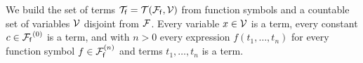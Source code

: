
\begin{definition}\label{def:terms}
	We build the set of {\myem terms }${\mathcal T}_{\mathsf f} = {{\mathcal T}({\mathcal F}_{\mathsf f},{\mathcal V})}$ 
	from function symbols and a
	countable set of {\myem variables }${\mathcal V}$ disjoint from ${\mathcal F}$\!.
	Every variable $x\in{\mathcal V}$ is a term,
	every {\myem constant} $c\in{{\mathcal F}_{\mathsf f}}^{(0)}$ is a term, 
	and with $n>0$ every expression $f(t_1,\ldots,t_n)$
	for every function symbol $f\in{{\mathcal F}_{\mathsf f}^{(n)}}$ 
	and terms $t_1,\ldots,t_n$
	is a term.
	
	
\end{definition}

